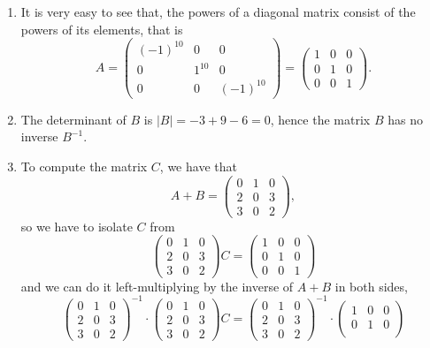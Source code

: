 \documentclass[11.0pt]{exam}
\begin{document}
\begin{questions}
\begin{solution}
\begin{enumerate}
    \item It is very easy to see that, the powers of a diagonal matrix consist of the powers of its elements, that is 
\[A=\begin{pmatrix}
(-1)^{10} & 0 & 0\\
0 & 1^{10} & 0\\
0 & 0 & (-1)^{10}
\end{pmatrix}=
\begin{pmatrix}
1 & 0 & 0\\
0 & 1 & 0\\
0 & 0 & 1
\end{pmatrix}.\]
\item The determinant of $B$ is $|B|=-3+9-6=0$, hence the matrix $B$ has no inverse $B^{-1}$.
\item To compute the matrix $C$, we have that 
\[A+B=\begin{pmatrix}
0 & 1 & 0\\
2 & 0 & 3\\
3 & 0 & 2
\end{pmatrix},\]
so we have to isolate $C$ from
\[
\begin{pmatrix}
0 & 1 & 0\\
2 & 0 & 3\\
3 & 0 & 2
\end{pmatrix}C=
\begin{pmatrix}
1 & 0 & 0\\
0 & 1 & 0\\
0 & 0 & 1
\end{pmatrix}\]
and we can do it left-multiplying by the inverse of $A+B$ in both sides,
\[
\begin{pmatrix}
0 & 1 & 0\\
2 & 0 & 3\\
3 & 0 & 2
\end{pmatrix}^{-1}\cdot
\begin{pmatrix}
0 & 1 & 0\\
2 & 0 & 3\\
3 & 0 & 2
\end{pmatrix}C=
\begin{pmatrix}
0 & 1 & 0\\
2 & 0 & 3\\
3 & 0 & 2
\end{pmatrix}^{-1}\cdot
\begin{pmatrix}
1 & 0 & 0\\
0 & 1 & 0\\

\end{pmatrix}\]
\end{enumerate}
\end{solution}
\end{questions}
\end{document}
